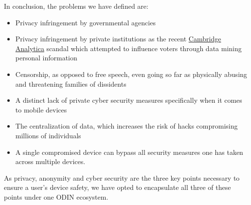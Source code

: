In conclusion, the problems we have defined are:
\begin{itemize}
   \item Privacy infringement by governmental agencies
   \item Privacy infringement by private institutions as the recent \href{https://www.bbc.com/news/technology-43465968}{Cambridge Analytica} scandal which attempted to influence voters through data mining personal information
   \item Censorship, as opposed to free speech, even going so far as physically abusing and threatening families of dissidents
   \item A distinct lack of private cyber security measures specifically when it comes to mobile devices
   \item The centralization of data, which increases the risk of hacks compromising millions of individuals
   \item A single compromised device can bypass all security measures one has taken across multiple devices.
\end{itemize}
As privacy, anonymity and cyber security are the three key points necessary to ensure a user's device safety, we have opted to encapsulate all three of these points under one ODIN ecosystem. 
